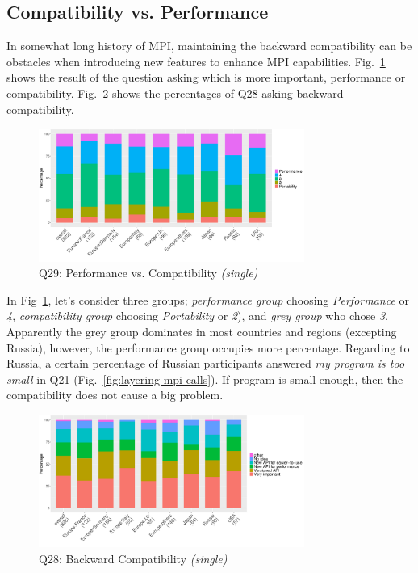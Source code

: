\documentclass[preprint,5p,times]{elsarticle}
\def\myquote#1{{\it #1}}
\begin{document}
\subsection{Compatibility vs. Performance}

In somewhat long history of MPI, maintaining the backward
compatibility can be obstacles when introducing new features to
enhance MPI capabilities. Fig.~\ref{fig:performance-vs-compatibility}
shows the result of the question asking which is more important,
performance or compatibility. Fig.~\ref{fig:compatibility} shows the
percentages of Q28 asking backward compatibility.

\begin{figure}[htb]
\begin{center}
\includegraphics[width=8.7cm]{R-scripts/Q29.pdf}
\caption{Q29: Performance vs. Compatibility {\it(single)}}
\label{fig:performance-vs-compatibility}
\end{center}
\end{figure}

In Fig~\ref{fig:performance-vs-compatibility}, let's consider three
groups; {\it performance group} choosing \myquote{Performance} or
\myquote{4}, {\it compatibility group} choosing \myquote{Portability} or
\myquote{2}), and {\it grey group} who chose \myquote{3}. Apparently the grey
group dominates in most countries and regions (excepting Russia),
however, the performance group occupies more percentage. Regarding to
Russia, a certain percentage of Russian participants answered
\myquote{my program is too small} in Q21
(Fig.~\ref{fig:layering-mpi-calls}). If program is small enough, then
the compatibility does not cause a big problem.

\begin{figure}[htb]
\begin{center}
\includegraphics[width=8.7cm]{R-scripts/Q28.pdf}
\caption{Q28: Backward Compatibility {\it(single)}}
\label{fig:compatibility}
\end{center}
\end{figure}
\end{document}
